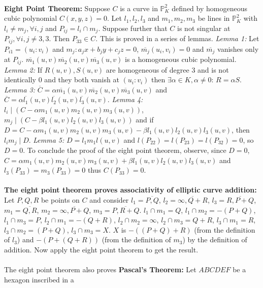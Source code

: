 \\
{\bf Eight Point Theorem:}
Suppose $C$ is a curve in ${\mathbb P}^2_K$ defined by 
homogeneous cubic polynomial $C(x,y,z)=0$.
Let $l_1, l_2, l_3$ and $m_1, m_2, m_3$ be lines in ${\mathbb P}^2_K$ with 
$l_i \ne m_j, \forall i,j$ and $P_{ij}= l_i \cap m_j$.  Suppose further that $C$ is not
singular at $P_{ij}, \forall i,j \ne 3,3$.  Then $P_{33} \in C$.
This is proved in a series of lemmas. \emph{Lemma 1:} Let $P_{i1}=(u_i : v_i)$ 
and $m_j : a_j x +b_j y +c_j z=0$, 
${\overline {m_j}} (u_i, v_i) = 0$ and
${\overline {m_j}}$ vanishes only at $P_{ij}$.
${\overline {m_1}} (u,v) {\overline {m_2}} (u,v) {\overline {m_3}} (u,v)$
is a homogeneous cubic polynomial.   
\emph{Lemma 2:} If $R(u,v), S(u,v)$ are homogeneous of
degree $3$ and is not identically $0$ and they both vanish at $(u_i:v_i)$ then 
$\exists  \alpha \in K, \alpha \ne 0$: $R = \alpha S$.  
\emph{Lemma 3:}
${\overline C}= \alpha {\overline {m_1}} (u,v) {\overline {m_2}} (u,v) {\overline {m_3}} (u,v)$
and
${\overline C}= \alpha {\overline {l_1}} (u,v) {\overline {l_2}} (u,v) {\overline {l_3}} (u,v)$.
\emph{Lemma 4:}  $l_i \mid (C - \alpha m_1 (u,v) m_2 (u,v) m_3 (u,v))$,
$m_j \mid (C - \beta l_1(u,v) l_2 (u,v) l_3 (u,v))$ and
if $D= C - \alpha m_1 (u,v) m_2 (u,v) m_3 (u,v) - \beta l_1 (u,v) l_2 (u,v) l_3 (u,v)$, then
$l_i m_ j \mid D$.  
\emph{Lemma 5:} $D = l_1 m_1 l(u,v)$ and
$l(P_{22})= l(P_{23})= l(P_{32})=0$, so $D=0$.  To conclude the proof of the
eight point theorem, observe, since $D=0$, 
$C= \alpha m_1 (u,v) m_2 (u,v) m_3 (u,v) + \beta l_1 (u,v) l_2 (u,v) l_3 (u,v)$ and
$l_3 (P_{33})= m_3 (P_{33}) =0$ thus $C (P_{33})=0$.
\\
\\
{\bf The eight point theorem proves associativity of elliptic curve addition:}
Let $P, Q, R$ be points
on $C$ and consider
$l_1= {\overline {P,Q}}$,
$l_2= {\overline {\infty,Q+R}}$,
$l_3= {\overline {R,P+Q}}$,
$m_1= {\overline {Q,R}}$,
$m_2= {\overline {\infty,P+Q}}$,
$m_3= {\overline {P,R+Q}}$.
$l_1 \cap m_1= Q$,
$l_1 \cap m_2= -(P+Q)$,
$l_1 \cap m_3= P$,
$l_2 \cap m_1= -(Q+R)$,
$l_2 \cap m_2= \infty$,
$l_2 \cap m_3= Q+R$,
$l_3 \cap m_1= R$,
$l_3 \cap m_2= (P+Q)$,
$l_3 \cap m_3= X$. $X$ is $-((P+Q)+R)$ (from the definition of $l_3$) and $-(P+(Q+R))$ 
(from the definition of $m_3$) by the definition of addition.  Now
apply the eight point theorem to get the result.
\\
\\
The eight point theorem also proves {\bf Pascal's Theorem:}
Let $ABCDEF$ be a hexagon inscribed in a
